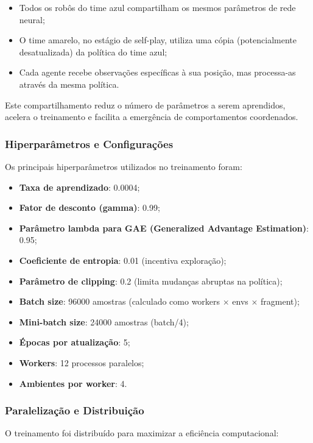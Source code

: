 \begin{itemize}
    \item Todos os robôs do time azul compartilham os mesmos parâmetros de rede neural;
    \item O time amarelo, no estágio de self-play, utiliza uma cópia (potencialmente desatualizada) da política do time azul;
    \item Cada agente recebe observações específicas à sua posição, mas processa-as através da mesma política.
\end{itemize}

Este compartilhamento reduz o número de parâmetros a serem aprendidos, acelera o treinamento e facilita a emergência de comportamentos coordenados.

\subsubsection{Hiperparâmetros e Configurações}

Os principais hiperparâmetros utilizados no treinamento foram:

\begin{itemize}
    \item \textbf{Taxa de aprendizado}: 0.0004;
    \item \textbf{Fator de desconto (gamma)}: 0.99;
    \item \textbf{Parâmetro lambda para GAE (Generalized Advantage Estimation)}: 0.95;
    \item \textbf{Coeficiente de entropia}: 0.01 (incentiva exploração);
    \item \textbf{Parâmetro de clipping}: 0.2 (limita mudanças abruptas na política);
    \item \textbf{Batch size}: 96000 amostras (calculado como workers $\times$ envs $\times$ fragment);
    \item \textbf{Mini-batch size}: 24000 amostras (batch/4);
    \item \textbf{Épocas por atualização}: 5;
    \item \textbf{Workers}: 12 processos paralelos;
    \item \textbf{Ambientes por worker}: 4.
\end{itemize}

\subsubsection{Paralelização e Distribuição}

O treinamento foi distribuído para maximizar a eficiência computacional:

